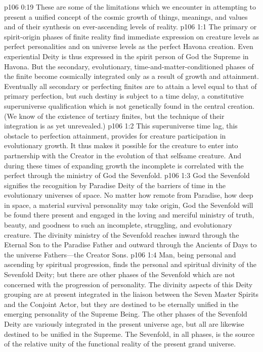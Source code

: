 \pc \vs p106 0:19 These are some of the limitations which we encounter in attempting to present a unified concept of the cosmic growth of things, meanings, and values and of their synthesis on ever\hyp{}ascending levels of reality.
\vs p106 1:1 The primary or spirit\hyp{}origin phases of finite reality find immediate expression on creature levels as perfect personalities and on universe levels as the perfect Havona creation. Even experiential Deity is thus expressed in the spirit person of God the Supreme in Havona. But the secondary, evolutionary, time\hyp{}and\hyp{}matter\hyp{}conditioned phases of the finite become cosmically integrated only as a result of growth and attainment. Eventually all secondary or perfecting finites are to attain a level equal to that of primary perfection, but such destiny is subject to a time delay, a constitutive superuniverse qualification which is not genetically found in the central creation. (We know of the existence of tertiary finites, but the technique of their integration is as yet unrevealed.)
\vs p106 1:2 This superuniverse time lag, this obstacle to perfection attainment, provides for creature participation in evolutionary growth. It thus makes it possible for the creature to enter into partnership with the Creator in the evolution of that selfsame creature. And during these times of expanding growth the incomplete is correlated with the perfect through the ministry of God the Sevenfold.
\vs p106 1:3 God the Sevenfold signifies the recognition by Paradise Deity of the barriers of time in the evolutionary universes of space. No matter how remote from Paradise, how deep in space, a material survival personality may take origin, God the Sevenfold will be found there present and engaged in the loving and merciful ministry of truth, beauty, and goodness to such an incomplete, struggling, and evolutionary creature. The divinity ministry of the Sevenfold reaches inward through the Eternal Son to the Paradise Father and outward through the Ancients of Days to the universe Fathers---the Creator Sons.
\vs p106 1:4 Man, being personal and ascending by spiritual progression, finds the personal and spiritual divinity of the Sevenfold Deity; but there are other phases of the Sevenfold which are not concerned with the progression of personality. The divinity aspects of this Deity grouping are at present integrated in the liaison between the Seven Master Spirits and the Conjoint Actor, but they are destined to be eternally unified in the emerging personality of the Supreme Being. The other phases of the Sevenfold Deity are variously integrated in the present universe age, but all are likewise destined to be unified in the Supreme. The Sevenfold, in all phases, is the source of the relative unity of the functional reality of the present grand universe.\plusone
